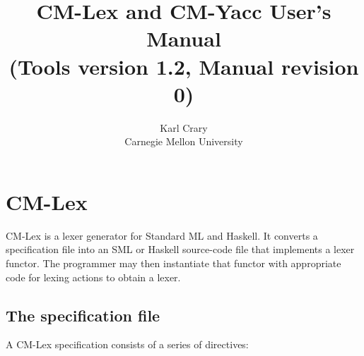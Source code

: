 \documentclass[10pt]{article}
\title{CM-Lex and CM-Yacc User's Manual \\ \Large
(Tools version 1.2, Manual revision 0)}
\author{Karl Crary \\ Carnegie Mellon University}
\begin{document}
\maketitle

\section{CM-Lex}

CM-Lex is a lexer generator for Standard ML and Haskell.  It converts
a specification file into an SML or Haskell source-code file that
implements a lexer functor.  The programmer may then instantiate that
functor with appropriate code for lexing actions to obtain a lexer.

\subsection{The specification file}

A CM-Lex specification consists of a series of directives:
\end{document}
